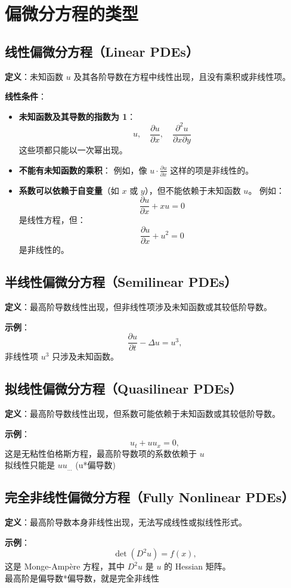 \section{偏微分方程的类型}

\subsection{线性偏微分方程（Linear PDEs）}
\textbf{定义}：未知函数 \(u\) 及其各阶导数在方程中线性出现，且没有乘积或非线性项。  

\textbf{线性条件}：
\begin{itemize}
    \item \textbf{未知函数及其导数的指数为 1}：
    \[
    u, \quad \frac{\partial u}{\partial x}, \quad \frac{\partial^2 u}{\partial x \partial y}
    \]
    这些项都只能以一次幂出现。

    \item \textbf{不能有未知函数的乘积}：  
    例如，像 \(u \cdot \frac{\partial u}{\partial x}\) 这样的项是非线性的。

    \item \textbf{系数可以依赖于自变量}（如 \(x\) 或 \(y\)），但不能依赖于未知函数 \(u\)。  
    例如：
    \[
    \frac{\partial u}{\partial x} + x u = 0
    \]
    是线性方程，但：
    \[
    \frac{\partial u}{\partial x} + u^2 = 0
    \]
    是非线性的。
\end{itemize}

\subsection{半线性偏微分方程（Semilinear PDEs）}
\textbf{定义}：最高阶导数线性出现，但非线性项涉及未知函数或其较低阶导数。

\textbf{示例}：
\begin{equation}
\frac{\partial u}{\partial t} - \Delta u = u^3,
\end{equation}
非线性项 \(u^3\) 只涉及未知函数。

\subsection{拟线性偏微分方程（Quasilinear PDEs）}
\textbf{定义}：最高阶导数线性出现，但系数可能依赖于未知函数或其较低阶导数。

\textbf{示例}：
\begin{equation}
u_t + u u_x = 0,
\end{equation}
这是无粘性伯格斯方程，最高阶导数项的系数依赖于 \(u\) \\
拟线性只能是 \(u u_{...}\) (u*偏导数)

\subsection{完全非线性偏微分方程（Fully Nonlinear PDEs）}
\textbf{定义}：最高阶导数本身非线性出现，无法写成线性或拟线性形式。

\textbf{示例}：
\begin{equation}
\det\left(D^2 u\right) = f(x),
\end{equation}
这是 Monge-Ampère 方程，其中 \(D^2 u\) 是 \(u\) 的 Hessian 矩阵。\\
最高阶是偏导数*偏导数，就是完全非线性